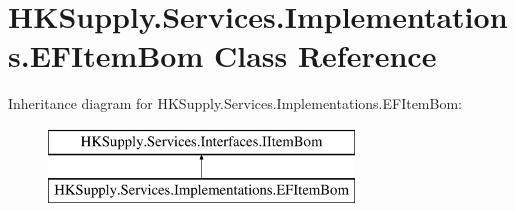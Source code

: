 \hypertarget{class_h_k_supply_1_1_services_1_1_implementations_1_1_e_f_item_bom}{}\section{H\+K\+Supply.\+Services.\+Implementations.\+E\+F\+Item\+Bom Class Reference}
\label{class_h_k_supply_1_1_services_1_1_implementations_1_1_e_f_item_bom}
Inheritance diagram for H\+K\+Supply.\+Services.\+Implementations.\+E\+F\+Item\+Bom\+:\begin{figure}[H]
\begin{center}
\leavevmode
\includegraphics[height=2.000000cm]{class_h_k_supply_1_1_services_1_1_implementations_1_1_e_f_item_bom}
\end{center}
\end{figure}

